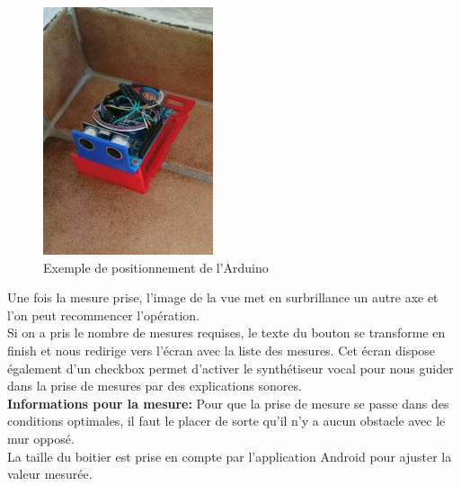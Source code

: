 \begin{figure}[H]
	\begin{center}
		\includegraphics[width=5cm]{img/arduino.jpg}
		\caption{Exemple de positionnement de l'Arduino}
		\label{arduino}
	\end{center}
\end{figure}
Une fois la mesure prise, l'image de la vue met en surbrillance un autre axe et l'on peut recommencer l'opération.\\ Si on a pris le nombre de mesures requises, le texte du bouton se transforme en finish et nous redirige vers l'écran avec la liste des mesures. Cet écran dispose également d'un checkbox permet d'activer le synthétiseur vocal pour nous guider dans la prise de mesures par des explications sonores.\\
\textbf{Informations pour la mesure: } Pour que la prise de mesure se passe dans des conditions optimales, il faut le placer de sorte qu'il n'y a aucun obstacle avec le mur opposé. \\
La taille du boitier est prise en compte par l'application Android pour ajuster la valeur mesurée.
